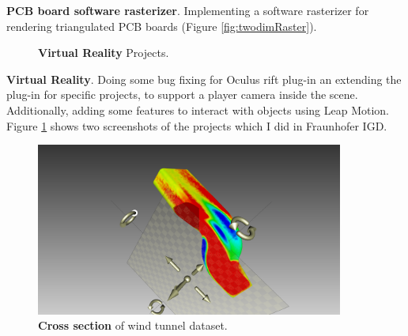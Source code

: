 \documentclass[]{report}
\begin{document}
\textbf{PCB board software rasterizer}. Implementing a software rasterizer for rendering triangulated PCB boards (Figure \ref{fig:twodimRaster}).

\begin{figure}[!ht]
	\hfill
	\caption[Virtual Reality]{\textbf{Virtual Reality} Projects.}
	\label{fig:VR}
\end{figure}

\textbf{Virtual Reality}. Doing some bug fixing for Oculus rift plug-in an extending the plug-in for specific projects, to support a player camera inside the scene. Additionally, adding some features to interact with objects using Leap Motion. Figure \ref{fig:VR} shows two screenshots of the projects which I did in Fraunhofer IGD. 



\begin{figure}[!ht]
	\centering
	\includegraphics[width=0.90\textwidth]{./figs/crosssection.png}
	\caption[Cross section]{\textbf{Cross section} of wind tunnel dataset.}
	\label{fig:crossection}
\end{figure}
\end{document}
